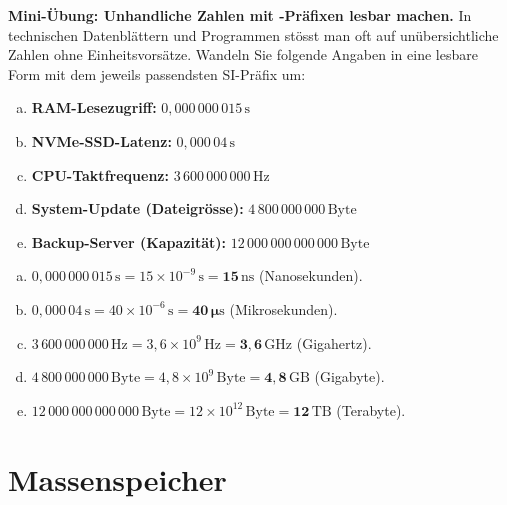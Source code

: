 \begin{myexercise}\label{myexercise:si-praefixe-umwandlung}
    \textbf{Mini-Übung: Unhandliche Zahlen mit -Präfixen lesbar machen.}
    In technischen Datenblättern und Programmen stösst man oft auf unübersichtliche Zahlen ohne Einheitsvorsätze. Wandeln Sie folgende Angaben in eine lesbare Form mit dem jeweils passendsten \gls{SI}-Präfix um:
    \begin{enumerate}[(a)]\setlength\itemsep{2pt}
        \item \textbf{\gls{RAM}-Lesezugriff:} $0{,}000\,000\,015\,\mathrm{s}$
        \item \textbf{\gls{NVMe}-\gls{SSD}-Latenz:} $0{,}000\,04\,\mathrm{s}$
        \item \textbf{\gls{CPU}-Taktfrequenz:} $3\,600\,000\,000\,\mathrm{Hz}$
        \item \textbf{System-Update (Dateigrösse):} $4\,800\,000\,000\,\mathrm{Byte}$
        \item \textbf{Backup-Server (Kapazität):} $12\,000\,000\,000\,000\,\mathrm{Byte}$
    \end{enumerate}

    \begin{myanswer}
        \begin{enumerate}[(a)]\setlength\itemsep{2pt}
            \item $0{,}000\,000\,015\,\mathrm{s} = 15 \times 10^{-9}\,\mathrm{s} = \mathbf{15\,\mathrm{ns}}$ (Nanosekunden).
            \item $0{,}000\,04\,\mathrm{s} = 40 \times 10^{-6}\,\mathrm{s} = \mathbf{40\,\mu\mathrm{s}}$ (Mikrosekunden).
            \item $3\,600\,000\,000\,\mathrm{Hz} = 3{,}6 \times 10^9\,\mathrm{Hz} = \mathbf{3{,}6\,\mathrm{GHz}}$ (Gigahertz).
            \item $4\,800\,000\,000\,\mathrm{Byte} = 4{,}8 \times 10^9\,\mathrm{Byte} = \mathbf{4{,}8\,\mathrm{GB}}$ (Gigabyte).
            \item $12\,000\,000\,000\,000\,\mathrm{Byte} = 12 \times 10^{12}\,\mathrm{Byte} = \mathbf{12\,\mathrm{TB}}$ (Terabyte).
        \end{enumerate}
    \end{myanswer}
\end{myexercise}

\section{Massenspeicher}\label{sec:massenspeicher}

